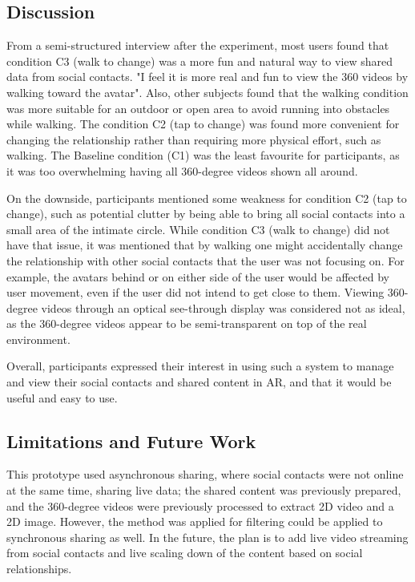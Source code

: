 \subsection{Discussion}

From a semi-structured interview after the experiment, most users found that condition C3 (walk to change) was a more fun and natural way to view shared data from social contacts. "I feel it is more real and fun to view the 360 videos by walking toward the avatar". Also, other subjects found that the walking condition was more suitable for an outdoor or open area to avoid running into obstacles while walking. The condition C2 (tap to change) was found more convenient for changing the relationship rather than requiring more physical effort, such as walking. The Baseline condition (C1) was the least favourite for participants, as it was too overwhelming having all 360-degree videos shown all around. 

On the downside, participants mentioned some weakness for condition C2 (tap to change), such as potential clutter by being able to bring all social contacts into a small area of the intimate circle. While condition C3 (walk to change) did not have that issue, it was mentioned that by walking one might accidentally change the relationship with other social contacts that the user was not focusing on. For example, the avatars behind or on either side of the user would be affected by user movement, even if the user did not intend to get close to them. Viewing 360-degree videos through an optical see-through display was considered not as ideal, as the 360-degree videos appear to be semi-transparent on top of the real environment.

Overall, participants expressed their interest in using such a system to manage and view their social contacts and shared content in AR, and that it would be useful and easy to use. 

\subsection{Limitations and Future Work}

This prototype used asynchronous sharing, where social contacts were not online at the same time, sharing live data; the shared content was previously prepared, and the 360-degree videos were previously processed to extract 2D video and a 2D image. However, the method was applied for filtering could be applied to synchronous sharing as well. In the future, the plan is to add live video streaming from social contacts and live scaling down of the content based on social relationships. 

